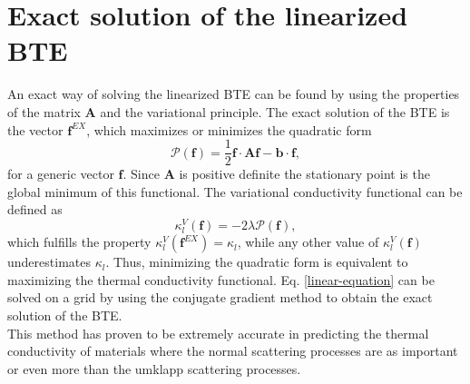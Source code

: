 \section{Exact solution of the linearized BTE}

An exact way of solving the linearized BTE can be found by using the properties of the matrix $\mathbf{A}$ and the variational principle. The exact solution of the BTE is the vector $\mathbf{f}^{EX}$, which maximizes or minimizes  
the quadratic form\cite{klemens1958thermal}
\begin{equation}
 \mathcal{P}(\mathbf{f})=\frac{1}{2}\mathbf{f}\cdot\mathbf{A}\mathbf{f}-\mathbf{b}\cdot\mathbf{f},
\end{equation}
for a generic vector $\mathbf{f}$. Since $\mathbf{A}$ is positive definite the stationary point is the global minimum of this functional. The variational conductivity functional can be defined as
\begin{equation}
 \kappa_{l}^{V}(\mathbf{f})=-2\lambda\mathcal{P}(\mathbf{f}),
\end{equation}
which fulfills the property $\kappa_{l}^{V}(\mathbf{f}^{EX})=\kappa_{l}$, while any other value of $\kappa_{l}^{V}(\mathbf{f})$ underestimates $\kappa_{l}$. Thus, minimizing the quadratic form is equivalent to 
maximizing the thermal conductivity functional. Eq. \ref{linear-equation} can be solved on a grid\cite{fugallo2013ab} by using the conjugate gradient method to obtain the exact solution of the BTE. \\

This method has proven to be extremely accurate in predicting the thermal conductivity of materials where the normal scattering processes are as important or even more than the umklapp scattering 
processes\cite{fugallo2014thermal,cepellotti2015phonon}. 
